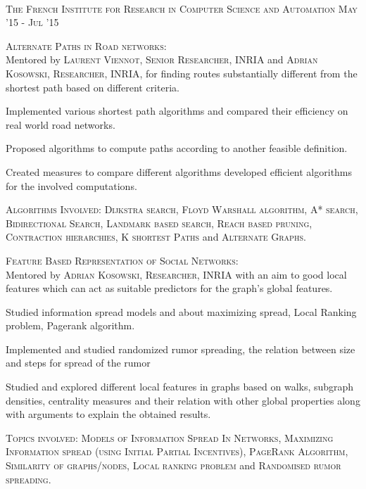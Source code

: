\documentclass[10pt]{article}
\begin{document}
	\vspace{1mm}
	
	{}	\hfill{} \\
	\small\textsc{The French Institute for Research in Computer Science and Automation}
	\hfill{\small{\textsc{May '15 - Jul '15}}}
	
	\begin{changemargin}{1.0cm}{0.0cm} 
	{
	\large{\textsc{{Alternate Paths in Road networks:}}}  \\
	\small{Mentored by \textsc{Laurent Viennot, Senior Researcher, INRIA} and \textsc{Adrian Kosowski, Researcher, INRIA}, for finding routes substantially different from the shortest path based on different criteria.} 
	\vspace{-1mm}
	\begin{itemize}
	\setlength\itemsep{-0.05em}
	\small
	{
	\item Implemented various shortest path algorithms and compared their efficiency on real world road networks.
	\item Proposed algorithms to compute paths according to another feasible definition.
	\item Created measures to compare different algorithms developed efficient algorithms for the involved computations.
	\item \textsc{Algorithms Involved:} \textsc{Dijkstra search, Floyd Warshall algorithm, A* search, Bidirectional Search, Landmark based search, Reach based pruning, Contraction hierarchies, K shortest Paths} and \textsc{Alternate Graphs}.
	}
	\end{itemize}
			
	\large{\textsc{Feature Based Representation of Social Networks:}} \\
	\small{Mentored by \textsc{Adrian Kosowski, Researcher, INRIA} with an aim to good local features which can act as suitable predictors for the graph's global features.} 
	\vspace{-1mm}
	\begin{itemize}
	\setlength\itemsep{-0.05em}
	\small
	{
	\item Studied information spread models and about maximizing spread, Local Ranking problem, Pagerank algorithm. 
	\item Implemented and studied randomized rumor spreading, the relation between size and steps for spread of the rumor
	\item Studied and explored different local features in graphs based on walks, subgraph densities, centrality measures and their relation with other global properties along with arguments to explain the obtained results.
	\item \textsc{Topics involved:} \textsc{Models of Information Spread In Networks, Maximizing Information spread (using Initial Partial Incentives), PageRank Algorithm, Similarity of graphs/nodes, Local ranking problem} and \textsc{Randomised rumor spreading}.
	}
	\end{itemize}
 	
	}
	\end{changemargin} 	
 	
\end{document}

